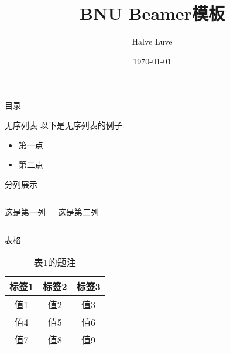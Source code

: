 \documentclass[aspectratio=169,xcolor=dvipsnames, t]{beamer}
\title[BNU-beamer]{BNU Beamer模板} %
\author{Halve Luve}
\institute[BNU-AI]{北京师范大学人工智能学院}
\date{\today} %
\let\oldsection\section
\renewcommand{\section}[2][\relax]{%
    \ifx#1\relax
      \oldsection{#2}%
    \else
      \oldsection[#1]{#2}%
    \fi%
    \label{sec:\thesection}%
}
\begin{document}
\maketitlepage
\begin{frame}[t]{目录}
    \tableofcontents
\end{frame}

    \begin{frame}{无序列表}
        以下是无序列表的例子:
        \begin{itemize}
            \item 第一点
            \item 第二点
        \end{itemize}
    \end{frame}

    \begin{frame}{分列展示}
        \begin{columns}
            这是第一列
            
            这是第二列
        \end{columns}
    \end{frame}

    \begin{frame}{表格}
        \begin{table}
            \centering
            \begin{tabular}{ccc}
                \hline
                \textbf{标签1} & \textbf{标签2} & \textbf{标签3} \\
                \hline 
                值1 & 值2 & 值3 \\ 
                值4 & 值5 & 值6 \\ 
                值7 & 值8 & 值9 \\ 
                \hline
            \end{tabular}
            \caption{表1的题注}
            \label{tab:table1}
        \end{table}
    \end{frame}
\end{document}
